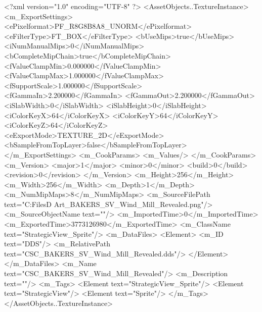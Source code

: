<?xml version="1.0" encoding="UTF-8" ?>
<AssetObjects..TextureInstance>
	<m_ExportSettings>
		<ePixelformat>PF_R8G8B8A8_UNORM</ePixelformat>
		<eFilterType>FT_BOX</eFilterType>
		<bUseMips>true</bUseMips>
		<iNumManualMips>0</iNumManualMips>
		<bCompleteMipChain>true</bCompleteMipChain>
		<fValueClampMin>0.000000</fValueClampMin>
		<fValueClampMax>1.000000</fValueClampMax>
		<fSupportScale>1.000000</fSupportScale>
		<fGammaIn>2.200000</fGammaIn>
		<fGammaOut>2.200000</fGammaOut>
		<iSlabWidth>0</iSlabWidth>
		<iSlabHeight>0</iSlabHeight>
		<iColorKeyX>64</iColorKeyX>
		<iColorKeyY>64</iColorKeyY>
		<iColorKeyZ>64</iColorKeyZ>
		<eExportMode>TEXTURE_2D</eExportMode>
		<bSampleFromTopLayer>false</bSampleFromTopLayer>
	</m_ExportSettings>
	<m_CookParams>
		<m_Values/>
	</m_CookParams>
	<m_Version>
		<major>1</major>
		<minor>0</minor>
		<build>0</build>
		<revision>0</revision>
	</m_Version>
	<m_Height>256</m_Height>
	<m_Width>256</m_Width>
	<m_Depth>1</m_Depth>
	<m_NumMipMaps>8</m_NumMipMaps>
	<m_SourceFilePath text="C:\Users\Shadow\Desktop\Working Files\2D Art\Quarters\Bakers\StrategicView\CSC_BAKERS_SV_Wind_Mill_Revealed.png"/>
	<m_SourceObjectName text=""/>
	<m_ImportedTime>0</m_ImportedTime>
	<m_ExportedTime>3773126980</m_ExportedTime>
	<m_ClassName text="StrategicView_Sprite"/>
	<m_DataFiles>
		<Element>
			<m_ID text="DDS"/>
			<m_RelativePath text="CSC_BAKERS_SV_Wind_Mill_Revealed.dds"/>
		</Element>
	</m_DataFiles>
	<m_Name text="CSC_BAKERS_SV_Wind_Mill_Revealed"/>
	<m_Description text=""/>
	<m_Tags>
		<Element text="StrategicView_Sprite"/>
		<Element text="StrategicView"/>
		<Element text="Sprite"/>
	</m_Tags>
</AssetObjects..TextureInstance>

